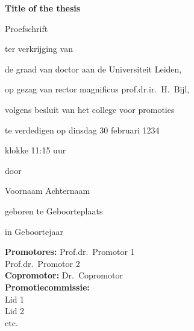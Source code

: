 \documentclass[../phdthesis.tex]{subfiles}
\begin{document}
\ifSubfilesClassLoaded{\frontmatter}{}
\begin{otherlanguage}{dutch}
\begin{titlepage}
	\begin{center}
		{\Large \textbf{Title of the thesis}}
		\vspace{2cm}

		{\large Proefschrift}
		\vspace{1cm}

		ter verkrijging van
		\vspace{.2cm}

		de graad van doctor aan de Universiteit Leiden,
		\vspace{.2cm}

		op gezag van rector magnificus prof.dr.ir.\ H.\ Bijl,
		\vspace{.2cm}

		volgens besluit van het college voor promoties
		\vspace{.2cm}

		te verdedigen op dinsdag 30 februari 1234
		\vspace{.2cm}

		klokke 11:15 uur
		\vspace{.5cm}

		door 
		\vspace{1cm}

		{\large Voornaam Achternaam}
		\vspace{.2cm}

		geboren te Geboorteplaats
		\vspace{.2cm}

		in Geboortejaar

	\end{center}
\end{titlepage}
\noindent\textbf{Promotores:} Prof.dr.~Promotor 1\\
\noindent{} Prof.dr.~Promotor 2
\\[.5cm]
\textbf{Copromotor:} Dr.~Copromotor
\\[1cm]
\textbf{Promotiecommissie:}\\
Lid 1\\
Lid 2\\
etc.\\

\vspace*{\fill}

\begin{center}
\end{center}

\thispagestyle{empty}
\end{otherlanguage}
\end{document}
